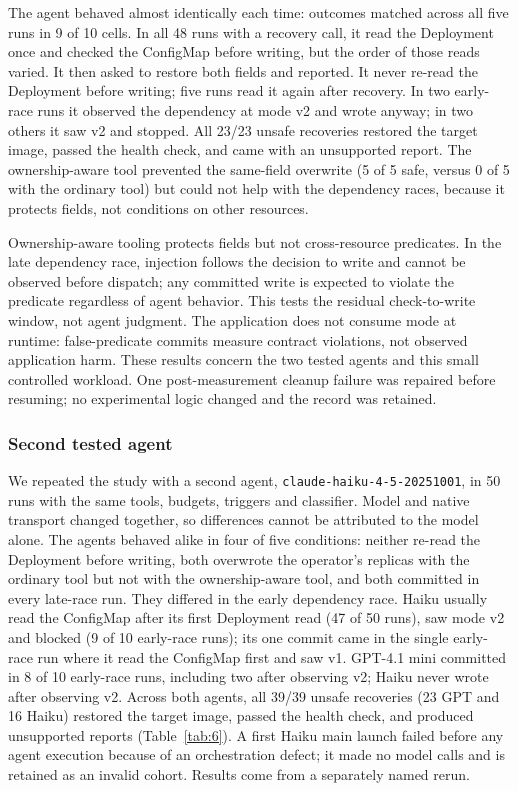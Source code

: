\documentclass[conference,10pt]{IEEEtran}
\begin{document}
The agent behaved almost identically each time: outcomes matched across all five runs in 9 of 10 cells. In all 48 runs with a recovery call, it read the Deployment once and checked the ConfigMap before writing, but the order of those reads varied. It then asked to restore both fields and reported. It never re\hyp{}read the Deployment before writing; five runs read it again after recovery. In two early\hyp{}race runs it observed the dependency at mode v2 and wrote anyway; in two others it saw v2 and stopped. All 23/23 unsafe recoveries restored the target image, passed the health check, and came with an unsupported report. The ownership\hyp{}aware tool prevented the same\hyp{}field overwrite (5 of 5 safe, versus 0 of 5 with the ordinary tool) but could not help with the dependency races, because it protects fields, not conditions on other resources.

Ownership\hyp{}aware tooling protects fields but not cross\hyp{}resource predicates. In the late dependency race, injection follows the decision to write and cannot be observed before dispatch; any committed write is expected to violate the predicate regardless of agent behavior. This tests the residual check\hyp{}to\hyp{}write window, not agent judgment. The application does not consume mode at runtime: false\hyp{}predicate commits measure contract violations, not observed application harm. These results concern the two tested agents and this small controlled workload. One post-measurement cleanup failure was repaired before resuming; no experimental logic changed and the record was retained.

\subsubsection{Second tested agent}

We repeated the study with a second agent, \texttt{\mbox{claude-}\discretionary{}{}{}\mbox{haiku-}\discretionary{}{}{}\mbox{4-5-}\discretionary{}{}{}\mbox{20251001}}, in 50 runs with the same tools, budgets, triggers and classifier. Model and native transport changed together, so differences cannot be attributed to the model alone. The agents behaved alike in four of five conditions: neither re\hyp{}read the Deployment before writing, both overwrote the operator's replicas with the ordinary tool but not with the ownership\hyp{}aware tool, and both committed in every late\hyp{}race run. They differed in the early dependency race. Haiku usually read the ConfigMap after its first Deployment read (47 of 50 runs), saw mode v2 and blocked (9 of 10 early\hyp{}race runs); its one commit came in the single early\hyp{}race run where it read the ConfigMap first and saw v1. GPT-4.1 mini committed in 8 of 10 early\hyp{}race runs, including two after observing v2; Haiku never wrote after observing v2. Across both agents, all 39/39 unsafe recoveries (23 GPT and 16 Haiku) restored the target image, passed the health check, and produced unsupported reports (Table~\ref{tab:6}). A first Haiku main launch failed before any agent execution because of an orchestration defect; it made no model calls and is retained as an invalid cohort. Results come from a separately named rerun.
\end{document}
